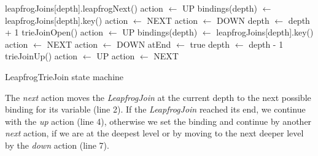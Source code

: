 \begin{algorithm}
     {
       {
         {
            leapfrogJoins[depth].leapfrogNext() \;
             {
                action $\leftarrow$ UP \;
            } {
                bindings(depth) $\leftarrow$ leapfrogJoins[depth].key() \;
                 {
                    action $\leftarrow$ NEXT
                } {
                    action $\leftarrow$ DOWN
                }
            }
        }
        {
          depth $\leftarrow$ depth + 1 \;
          trieJoinOpen() \;
           {
            action $\leftarrow$ UP \;
          } {
            bindings(depth) $\leftarrow$ leapfrogJoins[depth].key() \;
           {
             action $\leftarrow$ NEXT
          } {
            action $\leftarrow$ DOWN
          }
          }
       }
         {
           {
            atEnd $\leftarrow$ true \;
          } {
            depth $\leftarrow$ depth - 1 \;
            trieJoinUp() \;
             {
                action $\leftarrow$ UP \;
            } {
                action $\leftarrow$ NEXT \;
            }    
          }
        }
      }
    }  
    \caption{LeapfrogTrieJoin state machine}
    \label{alg:leapfrogTrieJoin-state-machine}
\end{algorithm}
The \textit{next} action moves the \textit{LeapfrogJoin} at the current depth to the next possible binding for its variable (line 2). %
If the \textit{LeapfrogJoin} reached its end, we continue with the \textit{up} action (line 4), %
otherwise we set the binding and continue by another \textit{next} action, if we are at the deepest level or by moving
to the next deeper level by the \textit{down} action (line 7). %

